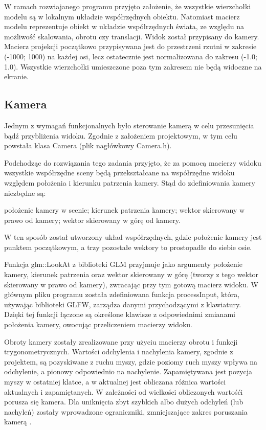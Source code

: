 W ramach rozwiajanego programu przyjęto założenie, że wszystkie wierzchołki modelu są w lokalnym układzie współrzędnych obiektu. Natomiast macierz modelu reprezentuje  obiekt w układzie współrzędnych świata, ze względu na możliwość skalowania, obrotu czy translacji. Widok został przypisany do kamery. Macierz projekcji początkowo przypisywana jest do przestrzeni rzutni w zakresie (-1000; 1000) na każdej osi, lecz ostatecznie jest normalizowana do zakresu (-1.0; 1.0). Wszystkie wierzchołki umieszczone poza tym zakresem nie będą widoczne na ekranie.

\subsection{Kamera}
Jednym z wymagań funkcjonalnych było sterowanie kamerą w celu przesunięcia bądź przybliżenia widoku. Zgodnie z założeniem projektowym, w tym celu powstała klasa Camera (plik nagłówkowy Camera.h).

Podchodząc do rozwiązania tego zadania przyjęto, że za pomocą macierzy widoku wszystkie współrzędne sceny będą przekształcane na współrzędne widoku względem położenia i kierunku patrzenia kamery. Stąd do zdefiniowania kamery niezbędne są: 
\begin{itemize}
\itemi położenie kamery w scenie;
\itemi kierunek patrzenia kamery;
\itemi wektor skierowany w prawo od kamery;
\itemi wektor skierowany w górę od kamery.
\end{itemize}
W ten sposób został utworzony układ współrzędnych, gdzie położenie kamery jest punktem początkowym, a trzy pozostałe wektory to prostopadłe do siebie osie. 

Funkcja glm::LookAt z biblioteki GLM przyjmuje jako argumenty położenie kamery, kierunek patrzenia oraz wektor skierowany w górę (tworzy z tego wektor skierowany w prawo od kamery), zwracając przy tym gotową macierz widoku. W głównym pliku programu została zdefiniowana funkcja processInput, która, używając biblioteki GLFW, zarządza danymi przychodzącymi z klawiatury. Dzięki tej funkcji łączone są określone klawisze z odpowiednimi zmianami położenia kamery, owocując przeliczeniem macierzy widoku.

Obroty kamery zostały zrealizowane przy użyciu macierzy obrotu i funkcji trygonometrycznych. Wartości odchylenia i nachylenia kamery, zgodnie z projektem, są pozyskiwane z ruchu myszy, gdzie poziomy ruch myszy wpływa na odchylenie, a pionowy odpowiednio na nachylenie. Zapamiętywana jest pozycja myszy w ostatniej klatce, a w aktualnej jest obliczana różnica wartości aktualnych i zapamiętanych. W zależności od wielkości obliczonych wartośći porusza się kamera. Dla uniknięcia zbyt szybkich albo dużych odchyleń (lub nachyleń) zostały wprowadzone ograniczniki, zmniejszające zakres poruszania kamerą \cite{learnopengl}. 

